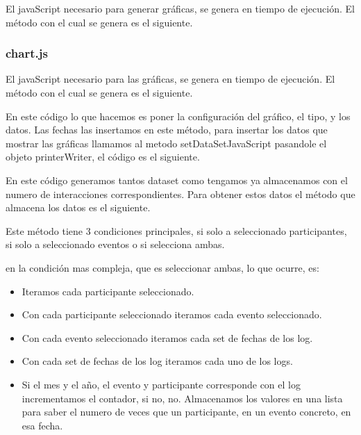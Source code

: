 El javaScript necesario para generar gráficas, se genera en tiempo de ejecución. El método con el cual se genera es el siguiente.


\subsubsection{chart.js}\label{chart-js}

El javaScript necesario para las gráficas, se genera en tiempo de ejecución. El método con el cual se genera es el siguiente.


En este código lo que hacemos es poner la configuración del gráfico, el tipo, y los datos. Las fechas las insertamos en este método, para insertar los datos que mostrar las gráficas llamamos al metodo setDataSetJavaScript pasandole el objeto printerWriter, el código es el siguiente.


En este código generamos tantos dataset como tengamos ya almacenamos con el numero de interacciones correspondientes. Para obtener estos datos el método que almacena los datos es el siguiente.


Este método tiene 3 condiciones principales, si solo a seleccionado participantes, si solo a seleccionado eventos o si selecciona ambas.

en la condición mas compleja, que es seleccionar ambas, lo que ocurre, es:

\begin{itemize}
	\tightlist
	\item
	Iteramos cada participante seleccionado.
	\item
	Con cada participante seleccionado iteramos cada evento seleccionado.
	\item
	Con cada evento seleccionado iteramos cada set de fechas de los log.
	\item
	Con cada set de fechas de los log iteramos cada uno de los logs.
	\item
	Si el mes y el año, el evento y participante corresponde con el log incrementamos el contador, si no, no. Almacenamos los valores en una lista para saber el numero de veces que un participante, en un evento concreto, en esa fecha.
\end{itemize}

